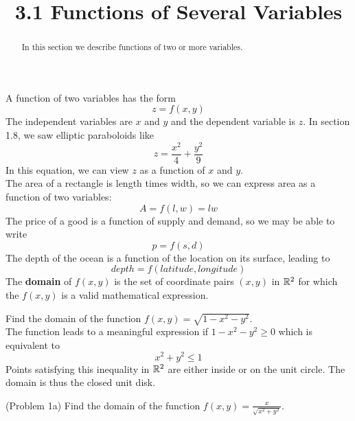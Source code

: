 \documentclass[handout]{ximera}
\title{3.1 Functions of Several Variables}
\begin{document}
\begin{abstract}
In this section we describe functions of two or more variables.
\end{abstract}

\maketitle

A function of two variables has the form
\[
z = f(x, y)
\]
The independent variables are $x$ and $y$ and the dependent variable is $z$. In section 1.8, we saw elliptic paraboloids like
\[
z = \frac{x^2}{4} + \frac{y^2}{9}
\]
In this equation, we can view $z$ as a function of $x$ and $y$.\\
The area of a rectangle is length times width, so we can express area as a function of two variables:
\[
A = f(l, w) = lw
\]
The price of a good is a function of supply and demand, so we may be able to write
\[
p = f(s, d)
\]
The depth of the ocean is a function of the location on its surface, leading to
\[
depth = f(latitude, longitude)
\]
The \textbf{domain} of $f(x, y)$ is the set of coordinate pairs $(x, y)$ in $\mathbb R^2$ for which the $f(x, y)$ is a valid mathematical expression.

\begin{example}[Example 1]
Find the domain of the function $f(x, y) = \sqrt{1 - x^2 - y^2}$.\\
The function leads to a meaningful expression if $1 - x^2 - y^2 \geq 0$ which  is equivalent to 
\[
x^2 + y^2 \leq 1
\]
Points satisfying this inequality in $\mathbb R^2$ are either inside  or on the unit circle.
The domain is thus the closed unit disk.

\begin{image}
\end{image}


\end{example}


\begin{problem}(Problem 1a)
Find the domain of the function $f(x, y) = \frac{x}{\sqrt{x^2 + y^2}}$.\\
\end{problem}
\end{document}
